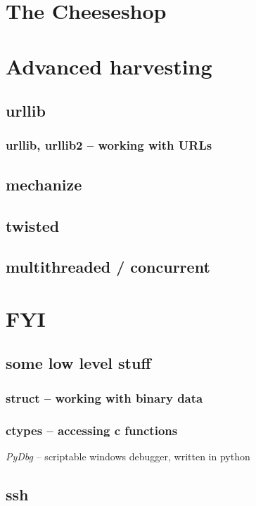 \documentclass{beamer}
\begin{document}
\section{The Cheeseshop}	%

\section{Advanced harvesting}


\subsection*{urllib}	%
\begin{frame}[fragile]
	\frametitle{urllib, urllib2 -- working with URLs}
\end{frame}

\subsection*{mechanize} %
\subsection*{twisted}	%
\subsection*{multithreaded / concurrent}	%

\section{FYI}

\subsection*{some low level stuff}	%

\begin{frame}
	\frametitle{struct -- working with binary data}
\end{frame}

\begin{frame}
	\frametitle{ctypes -- accessing c functions}
	\emph{PyDbg} -- scriptable windows debugger, written in python
\end{frame}

\subsection*{ssh}
\end{document}
